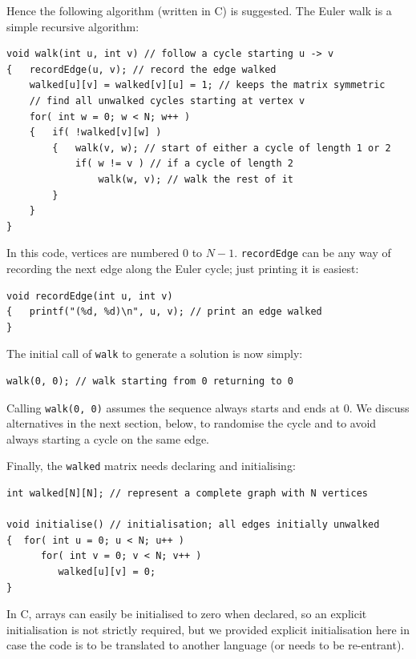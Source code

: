 \documentclass[12pt]{article}
\begin{document}
Hence the following algorithm (written in C) is suggested.  The Euler walk is a simple recursive algorithm:
 
\begin{Verbatim}
void walk(int u, int v) // follow a cycle starting u -> v
{   recordEdge(u, v); // record the edge walked
    walked[u][v] = walked[v][u] = 1; // keeps the matrix symmetric
    // find all unwalked cycles starting at vertex v
    for( int w = 0; w < N; w++ )
    {   if( !walked[v][w] )
        {   walk(v, w); // start of either a cycle of length 1 or 2
            if( w != v ) // if a cycle of length 2
                walk(w, v); // walk the rest of it
        } 
    }
}
\end{Verbatim}

In this code, vertices are numbered $0$ to $N-1$. \texttt{recordEdge} can be any way of recording the next edge along the Euler cycle; just printing it is easiest:

\begin{Verbatim}
void recordEdge(int u, int v) 
{   printf("(%d, %d)\n", u, v); // print an edge walked
}
\end{Verbatim}

The initial call of \texttt{walk} to generate a solution is now simply:  

\begin{Verbatim}      
walk(0, 0); // walk starting from 0 returning to 0
\end{Verbatim}

Calling \texttt{walk(0, 0)} assumes the sequence always starts and ends at 0. We discuss alternatives in the next section, below, to randomise the cycle and to avoid always starting a cycle on the same edge.

Finally, the \texttt{walked} matrix needs declaring and initialising: 

\begin{Verbatim}
int walked[N][N]; // represent a complete graph with N vertices

void initialise() // initialisation; all edges initially unwalked
{  for( int u = 0; u < N; u++ )
      for( int v = 0; v < N; v++ )
         walked[u][v] = 0; 
}
\end{Verbatim}

In C, arrays can easily be initialised to zero when declared, so an explicit initialisation is not strictly required, but we provided explicit initialisation here in case the code is to be translated to another language (or needs to be re-entrant). 
\end{document}
